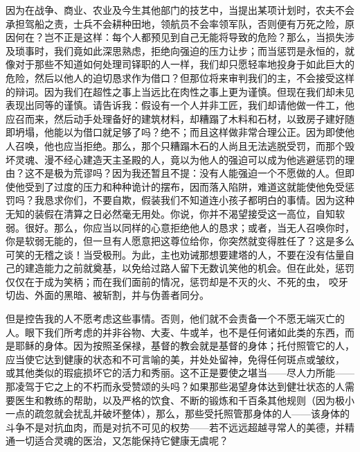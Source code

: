 因为在战争、商业、农业及今生其他部门的技艺中，当提出某项计划时，农夫不会承担驾船之责，士兵不会耕种田地，领航员不会率领军队，否则便有万死之险，原因何在？岂不正是这样：每个人都预见到自己无能将导致的危险？那么，当损失涉及琐事时，我们竟如此深思熟虑，拒绝向强迫的压力让步；而当惩罚是永恒的，就像对于那些不知道如何处理司铎职的人一样，我们却只愿轻率地投身于如此巨大的危险，然后以他人的迫切恳求作为借口？但那位将来审判我们的主，不会接受这样的辩词。因为我们在超性之事上当远比在肉性之事上更为谨慎。但现在我们却未见表现出同等的谨慎。请告诉我：假设有一个人并非工匠，我们却请他做一件工，他应召而来，然后动手处理备好的建筑材料，却糟蹋了木料和石材，以致房子建好随即坍塌，他能以为借口就足够了吗？绝不；而且这样做非常合理公正。因为即使他人召唤，他也应当拒绝。那么，那个只糟蹋木石的人尚且无法逃脱受罚，而那个毁坏灵魂、漫不经心建造天主圣殿的人，竟以为他人的强迫可以成为他逃避惩罚的理由？这不是极为荒谬吗？因为我还暂且不提：没有人能强迫一个不愿做的人。但即使他受到了过度的压力和种种诡计的摆布，因而落入陷阱，难道这就能使他免受惩罚吗？我恳求你们，不要自欺，假装我们不知道连小孩子都明白的事情。因为这种无知的装假在清算之日必然毫无用处。你说，你并不渴望接受这一高位，自知软弱。很好。那么，你应当以同样的心意拒绝他人的恳求；或者，当无人召唤你时，你是软弱无能的，但一旦有人愿意把这尊位给你，你突然就变得胜任了？这是多么可笑的无稽之谈！当受极刑。为此，主也劝诫那想要建塔的人，不要在没有估量自己的建造能力之前就奠基，以免给过路人留下无数讥笑他的机会。但在此处，惩罚仅仅在于成为笑柄；而在我们面前的情况，惩罚却是不灭的火、不死的虫， 咬牙切齿、外面的黑暗、被斩割，并与伪善者同分。\par

但是控告我的人不愿考虑这些事情。否则，他们就不会责备一个不愿无端灭亡的人。眼下我们所考虑的并非谷物、大麦、牛或羊，也不是任何诸如此类的东西，而是耶稣的身体。因为按照圣保禄，基督的教会就是基督的身体；托付照管它的人，应当使它达到健康的状态和不可言喻的美，并处处留神，免得任何斑点或皱纹， 或其他类似的瑕疵损坏它的活力和秀丽。这不正是要使之堪当——尽人力所能——那凌驾于它之上的不朽而永受赞颂的头吗？如果那些渴望身体达到健壮状态的人需要医生和教练的帮助，以及严格的饮食、不断的锻炼和千百条其他规则（因为极小一点的疏忽就会扰乱并破坏整体），那么，那些受托照管那身体的人——该身体的斗争不是对抗血肉，而是对抗不可见的权势——若不远远超越寻常人的美德，并精通一切适合灵魂的医治，又怎能保持它健康无虞呢？\par


